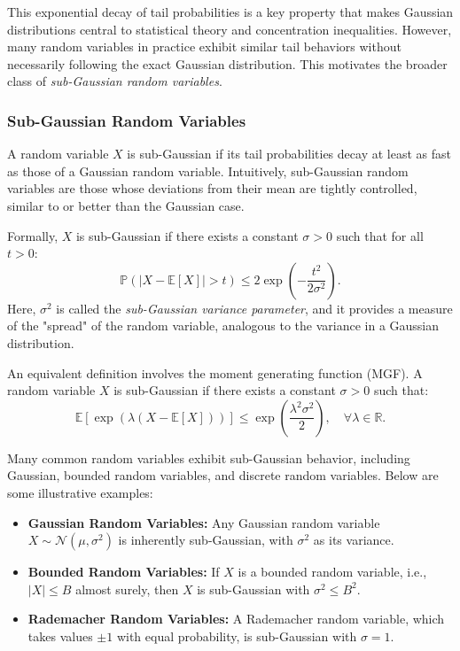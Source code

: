 This exponential decay of tail probabilities is a key property that makes Gaussian distributions central to statistical theory and concentration inequalities. However, many random variables in practice exhibit similar tail behaviors without necessarily following the exact Gaussian distribution. This motivates the broader class of \textit{sub-Gaussian random variables}.  

\subsubsection{Sub-Gaussian Random Variables}  
A random variable \( X \) is sub-Gaussian if its tail probabilities decay at least as fast as those of a Gaussian random variable. Intuitively, sub-Gaussian random variables are those whose deviations from their mean are tightly controlled, similar to or better than the Gaussian case.  

Formally, \( X \) is sub-Gaussian if there exists a constant \( \sigma > 0 \) such that for all \( t > 0 \):  
\[
\mathbb{P}(\vert X - \mathbb{E}[X] \vert > t) \leq 2 \exp\left(-\frac{t^2}{2\sigma^2}\right).
\]  
Here, \( \sigma^2 \) is called the \textit{sub-Gaussian variance parameter}, and it provides a measure of the "spread" of the random variable, analogous to the variance in a Gaussian distribution.  

An equivalent definition involves the moment generating function (MGF). A random variable \( X \) is sub-Gaussian if there exists a constant \( \sigma > 0 \) such that:  
\[
\mathbb{E}[\exp(\lambda(X - \mathbb{E}[X]))] \leq \exp\left(\frac{\lambda^2 \sigma^2}{2}\right), \quad \forall \lambda \in \mathbb{R}.
\]  

Many common random variables exhibit sub-Gaussian behavior, including Gaussian, bounded random variables, and discrete random variables. Below are some illustrative examples:  
\begin{itemize}
    \item \textbf{Gaussian Random Variables:} Any Gaussian random variable \( X \sim \mathcal{N}(\mu, \sigma^2) \) is inherently sub-Gaussian, with \( \sigma^2 \) as its variance.  
    \item \textbf{Bounded Random Variables:} If \( X \) is a bounded random variable, i.e., \( \vert X \vert \leq B \) almost surely, then \( X \) is sub-Gaussian with \( \sigma^2 \leq B^2 \).
    \item \textbf{Rademacher Random Variables:} A Rademacher random variable, which takes values \( \pm 1 \) with equal probability, is sub-Gaussian with \( \sigma = 1 \).  
\end{itemize}  

